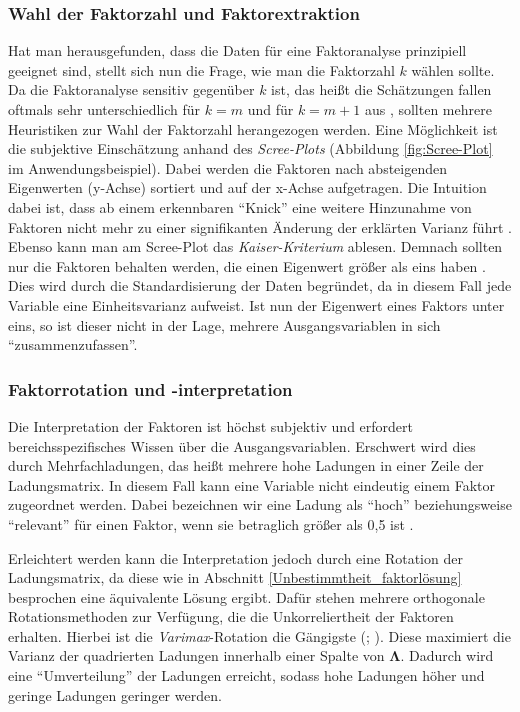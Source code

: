\documentclass[11pt]{scrartcl}
\begin{document}
	\subsubsection{Wahl der Faktorzahl und Faktorextraktion}
	\label{Faktorextraktion und Faktorzahl}
	Hat man herausgefunden, dass die Daten für eine Faktoranalyse
	prinzipiell geeignet sind, stellt sich nun die Frage, wie man die Faktorzahl $k$ wählen sollte.
	Da die Faktoranalyse sensitiv gegenüber $k$ ist, das heißt die Schätzungen fallen oftmals sehr
	unterschiedlich für $k=m$ und für $k=m+1$ aus \parencite[142]{Everitt.2011}, sollten mehrere 
	Heuristiken zur Wahl der Faktorzahl herangezogen werden.
	Eine Möglichkeit ist die subjektive Einschätzung anhand des \textit{Scree-Plots} (Abbildung \ref{fig:Scree-Plot} im Anwendungsbeispiel).
	Dabei werden die Faktoren nach absteigenden Eigenwerten (y-Achse) sortiert und auf der x-Achse aufgetragen.
	Die Intuition dabei ist, dass ab einem erkennbaren \enquote{Knick} eine weitere Hinzunahme von Faktoren
	nicht mehr zu einer signifikanten Änderung der erklärten Varianz führt \parencite[448]{Backhaus.2021}.
	Ebenso kann man am Scree-Plot das \textit{Kaiser-Kriterium} ablesen. Demnach sollten nur die Faktoren
	behalten werden, die einen Eigenwert größer als eins haben \parencite[447 - 448]{Backhaus.2021}. Dies wird
	durch die Standardisierung der Daten begründet, da in diesem Fall jede Variable eine Einheitsvarianz aufweist.
	Ist nun der Eigenwert eines Faktors unter eins, so ist dieser nicht in der Lage, mehrere Ausgangsvariablen in sich
	\enquote{zusammenzufassen}.
	
	
	\subsubsection{Faktorrotation und -interpretation} 
	\label{Faktorrotation und -interpretation}
	
	Die Interpretation der Faktoren ist höchst subjektiv und erfordert bereichsspezifisches Wissen über die Ausgangsvariablen. Erschwert wird dies
	durch Mehrfachladungen, das heißt mehrere hohe Ladungen in einer Zeile der Ladungsmatrix. In diesem Fall kann eine Variable nicht eindeutig einem Faktor zugeordnet werden. Dabei bezeichnen wir eine Ladung als \enquote{hoch} beziehungsweise \enquote{relevant} für einen Faktor, wenn sie betraglich größer als 0,5 ist \parencite[451]{Backhaus.2021}.
	
	Erleichtert werden kann die Interpretation jedoch durch eine Rotation der Ladungsmatrix, da diese wie in
	Abschnitt \ref{Unbestimmtheit_faktorlösung} besprochen eine äquivalente Lösung
	ergibt. Dafür stehen mehrere orthogonale Rotationsmethoden zur Verfügung, die die Unkorreliertheit
	der Faktoren erhalten. Hierbei ist die \textit{Varimax}-Rotation die Gängigste (\cite[434]{Rencher.2002}; \cite{Kaiser.1958}).
	Diese maximiert die Varianz der quadrierten Ladungen innerhalb einer Spalte von
	$\mathbf{\Lambda}$. Dadurch wird eine \enquote{Umverteilung} der Ladungen
	erreicht, sodass hohe Ladungen höher und geringe Ladungen geringer werden.
	
\end{document}
